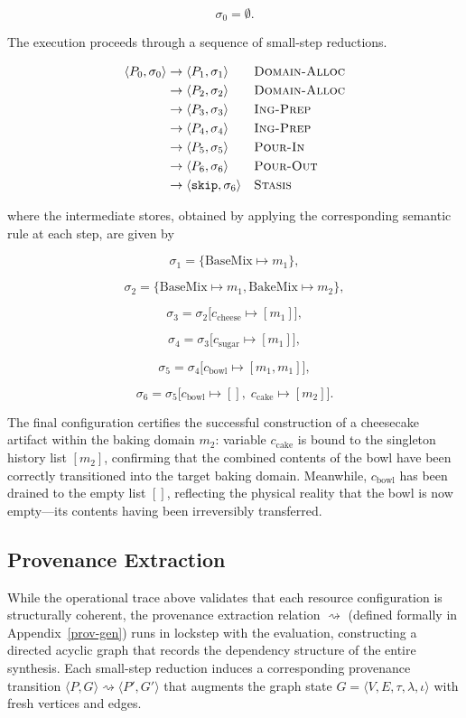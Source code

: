 \documentclass[11pt, a4paper]{article}
\begin{document}
\[
\sigma_0 = \emptyset.
\]

The execution proceeds through a sequence of small-step reductions.

\begin{align*}
\langle P_0,\sigma_0\rangle
&\to
\langle P_1,\sigma_1\rangle
&& \textsc{Domain-Alloc}
\\
&\to
\langle P_2,\sigma_2\rangle
&& \textsc{Domain-Alloc}
\\
&\to
\langle P_3,\sigma_3\rangle
&& \textsc{Ing-Prep}
\\
&\to
\langle P_4,\sigma_4\rangle
&& \textsc{Ing-Prep}
\\
&\to
\langle P_5,\sigma_5\rangle
&& \textsc{Pour-In}
\\
&\to
\langle P_6,\sigma_6\rangle
&& \textsc{Pour-Out}
\\
&\to
\langle \texttt{skip},\sigma_6\rangle
&& \textsc{Stasis}
\end{align*}

where the intermediate stores, obtained by applying the corresponding semantic rule at each step, are given by

\[
\sigma_1
=
\{
\text{BaseMix} \mapsto m_1
\},
\]

\[
\sigma_2
=
\{
\text{BaseMix} \mapsto m_1,
\text{BakeMix} \mapsto m_2
\},
\]

\[
\sigma_3
=
\sigma_2
\bigl[
c_{\mathrm{cheese}}
\mapsto
[m_1]
\bigr],
\]

\[
\sigma_4
=
\sigma_3
\bigl[
c_{\mathrm{sugar}}
\mapsto
[m_1]
\bigr],
\]

\[
\sigma_5
=
\sigma_4
\bigl[
c_{\mathrm{bowl}}
\mapsto
[m_1,m_1]
\bigr],
\]

\[
\sigma_6
=
\sigma_5
\bigl[
c_{\mathrm{bowl}}
\mapsto
[],
\;
c_{\mathrm{cake}}
\mapsto
[m_2]
\bigr].
\]

The final configuration certifies the successful construction of a cheesecake artifact within the baking domain $m_2$: variable $c_{\mathrm{cake}}$ is bound to the singleton history list $[m_2]$, confirming that the combined contents of the bowl have been correctly transitioned into the target baking domain. Meanwhile, $c_{\mathrm{bowl}}$ has been drained to the empty list $[]$, reflecting the physical reality that the bowl is now empty—its contents having been irreversibly transferred.

\subsection{Provenance Extraction}
While the operational trace above validates that each resource configuration is structurally coherent, the provenance extraction relation $\rightsquigarrow$ (defined formally in Appendix~\ref{prov-gen}) runs in lockstep with the evaluation, constructing a directed acyclic graph that records the dependency structure of the entire synthesis. Each small-step reduction induces a corresponding provenance transition $\langle P, G\rangle \rightsquigarrow \langle P', G'\rangle$ that augments the graph state $G = \langle V, E, \tau, \lambda, \iota\rangle$ with fresh vertices and edges.
\end{document}
